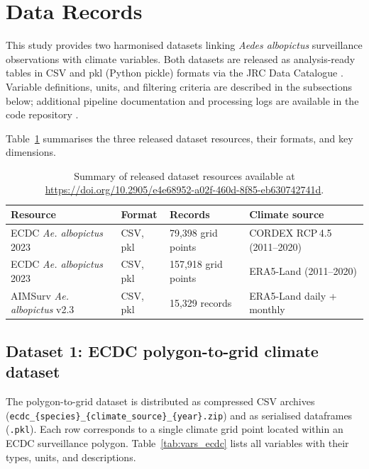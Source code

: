 \documentclass[11pt]{article}
\begin{document}
\section*{Data Records}

This study provides two harmonised datasets linking \textit{Aedes albopictus} surveillance observations with climate variables. Both datasets are released as analysis-ready tables in CSV and pkl (Python pickle) formats via the JRC Data Catalogue \cite{aedes_dataset_jrc}. Variable definitions, units, and filtering criteria are described in the subsections below; additional pipeline documentation and processing logs are available in the code repository \cite{aedes_data_repo}.

Table~\ref{tab:datasets} summarises the three released dataset resources, 
their formats, and key dimensions.

\begin{table}[htbp]
\caption{Summary of released dataset resources available at 
\url{https://doi.org/10.2905/e4e68952-a02f-460d-8f85-eb630742741d}.}
\label{tab:datasets}
\small
\setlength{\tabcolsep}{4pt}
\begin{tabular}{p{5.5cm}p{2.0cm}p{2.2cm}p{4.6cm}}
\hline
Resource & Format & Records & Climate source \\
\hline
ECDC \textit{Ae. albopictus} 2023 & CSV, pkl & 79,398 grid points & CORDEX RCP\,4.5 (2011--2020) \\
ECDC \textit{Ae. albopictus} 2023 & CSV, pkl & 157,918 grid points & ERA5-Land (2011--2020) \\
AIMSurv \textit{Ae. albopictus} v2.3 & CSV, pkl & 15,329 records & 
ERA5-Land daily + monthly \\
\hline
\end{tabular}
\end{table}

\subsection*{Dataset 1: ECDC polygon-to-grid climate dataset}

The polygon-to-grid dataset is distributed as compressed CSV archives 
(\texttt{ecdc\_\{species\}\_\{climate\_source\}\_\{year\}.zip}) and as 
serialised dataframes (\texttt{.pkl}). Each row corresponds to a single 
climate grid point located within an ECDC surveillance polygon. 
Table~\ref{tab:vars_ecdc} lists all variables with their types, units, 
and descriptions.
\end{document}
